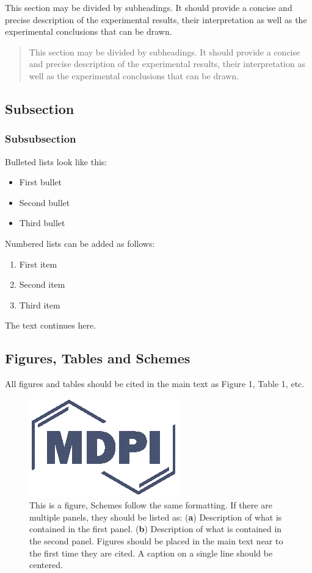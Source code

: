 \documentclass[jof,article,submit,moreauthors,pdftex,10pt,a4paper]{Definitions/mdpi}
\begin{document}
This section may be divided by subheadings. It should provide a concise and precise description of the experimental results, their interpretation as well as the experimental conclusions that can be drawn.
\begin{quote}
This section may be divided by subheadings. It should provide a concise and precise description of the experimental results, their interpretation as well as the experimental conclusions that can be drawn.
\end{quote}

\subsection{Subsection}
\unskip
\subsubsection{Subsubsection}

Bulleted lists look like this:
\begin{itemize}[leftmargin=*,labelsep=5.8mm]
\item	First bullet
\item	Second bullet
\item	Third bullet
\end{itemize}

Numbered lists can be added as follows:
\begin{enumerate}[leftmargin=*,labelsep=4.9mm]
\item	First item 
\item	Second item
\item	Third item
\end{enumerate}

The text continues here.

\subsection{Figures, Tables and Schemes}

All figures and tables should be cited in the main text as Figure 1, Table 1, etc.

\begin{figure}[H]
\centering
\includegraphics[width=2 cm]{Definitions/logo-mdpi}
\caption{This is a figure, Schemes follow the same formatting. If there are multiple panels, they should be listed as: (\textbf{a}) Description of what is contained in the first panel. (\textbf{b}) Description of what is contained in the second panel. Figures should be placed in the main text near to the first time they are cited. A caption on a single line should be centered.}
\end{figure}   
 
\end{document}
